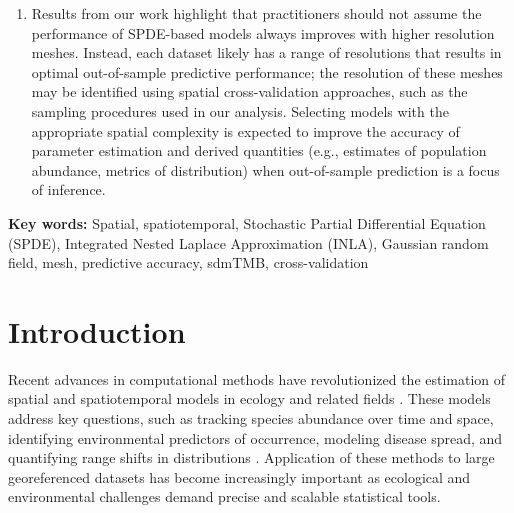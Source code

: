 \documentclass[11pt]{article}
\begin{document}
{\begin{enumerate}
  Finally, our applications of delta-models to groundfish demonstrates
  that for most species, there is little effect of mesh resolution on
  area-weighted biomass indices that integrate model predictions.
\item
  Results from our work highlight that practitioners should not assume
  the performance of SPDE-based models always improves with higher
  resolution meshes. Instead, each dataset likely has a range of
  resolutions that results in optimal out-of-sample predictive
  performance; the resolution of these meshes may be identified using
  spatial cross-validation approaches, such as the sampling procedures
  used in our analysis. Selecting models with the appropriate spatial
  complexity is expected to improve the accuracy of parameter estimation
  and derived quantities (e.g., estimates of population abundance,
  metrics of distribution) when out-of-sample prediction is a focus of
  inference.
\end{enumerate}
}

\textbf{Key words:} 
Spatial, spatiotemporal, Stochastic Partial Differential Equation
(SPDE), Integrated Nested Laplace Approximation (INLA), Gaussian random
field, mesh, predictive accuracy, sdmTMB, cross-validation

\section{Introduction}

Recent advances in computational methods have revolutionized the estimation of
spatial and spatiotemporal models in ecology and related fields
\citep{banerjee_bayesian_2012, thorsonkristensen2024}. These models address key
questions, such as tracking species abundance over time and space, identifying
environmental predictors of occurrence, modeling disease spread, and
quantifying range shifts in distributions \citep[e.g.,][]{ross_accessible_2012,
miller_spatial_2013, thorson_comparing_2017}. Application of these methods to
large georeferenced datasets has become increasingly important as ecological
and environmental challenges demand precise and scalable statistical tools.
\end{document}
